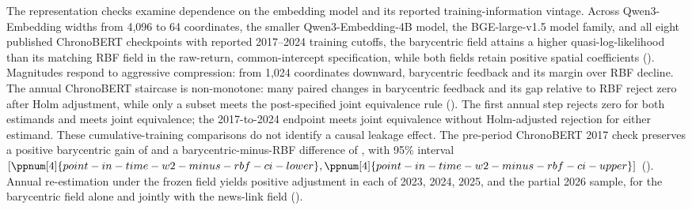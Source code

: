 The representation checks examine dependence on the embedding model and
its reported training-information vintage.
Across Qwen3-Embedding widths from 4,096 to 64 coordinates, the smaller
Qwen3-Embedding-4B model, the BGE-large-v1.5 model family, and all eight
published ChronoBERT checkpoints with reported 2017--2024 training cutoffs,
the barycentric field attains a higher quasi-log-likelihood than its matching
RBF field in the raw-return, common-intercept specification, while both fields
retain positive spatial coefficients
().
Magnitudes respond to aggressive compression: from 1,024 coordinates downward,
barycentric feedback and its margin over RBF decline.
The annual ChronoBERT staircase is non-monotone: many paired changes in
barycentric feedback and its gap relative to RBF reject zero after Holm
adjustment, while only a subset meets the post-specified joint equivalence
rule ().
The first annual step rejects zero for both estimands and meets joint
equivalence; the 2017-to-2024 endpoint meets joint equivalence without
Holm-adjusted rejection for either estimand.
These cumulative-training comparisons do not identify a causal leakage effect.
The pre-period ChronoBERT 2017 check preserves a positive barycentric gain of
 and a barycentric-minus-RBF
difference of
, with 95\% interval
$[\ppnum[4]{point-in-time-w2-minus-rbf-ci-lower},
\ppnum[4]{point-in-time-w2-minus-rbf-ci-upper}]$
().
Annual re-estimation under the frozen field yields positive adjustment in each
of 2023, 2024, 2025, and the partial 2026 sample, for the barycentric field
alone and jointly with the news-link field
().
